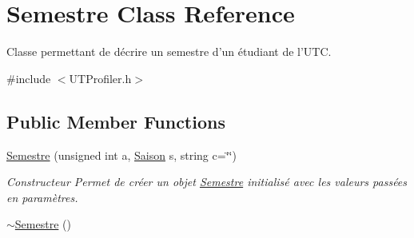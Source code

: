 \hypertarget{class_semestre}{\section{Semestre Class Reference}
\label{class_semestre}
}


Classe permettant de décrire un semestre d'un étudiant de l'U\-T\-C.  




{\ttfamily \#include $<$U\-T\-Profiler.\-h$>$}

\subsection*{Public Member Functions}
\begin{DoxyCompactItemize}
\item 
\hyperlink{class_semestre_a3980fc8447360ad2ba3c769e40ed0efa}{Semestre} (unsigned int a, \hyperlink{_u_t_profiler_8h_a72fcaae0ef529616dd62b747e259d545}{Saison} s, string c=\char`\"{}\char`\"{})
\begin{DoxyCompactList}\small\item\em Constructeur Permet de créer un objet \hyperlink{class_semestre}{Semestre} initialisé avec les valeurs passées en paramètres. \end{DoxyCompactList}\item 
\hypertarget{class_semestre_a5a495cd21f249b5a1be4d3c7ebd01e88}{\hyperlink{class_semestre_a5a495cd21f249b5a1be4d3c7ebd01e88}{$\sim$\-Semestre} ()}\label{class_semestre_a5a495cd21f249b5a1be4d3c7ebd01e88}


\end{DoxyCompactItemize}
